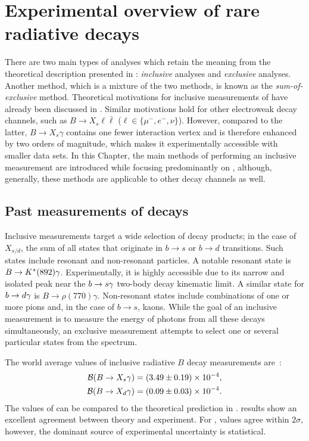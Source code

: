 \chapter{Experimental overview of rare radiative decays}\label{ch:exp_overview}

There are two main types of analyses which retain the meaning 
from the theoretical description presented in : \textit{inclusive} analyses and \textit{exclusive} analyses.
Another method, which is a mixture of the two methods, is known as the \textit{sum-of-exclusive} method.
Theoretical motivations for inclusive measurements of \BtoXsgamma have already been discussed in .
Similar motivations hold for other electroweak decay channels, such as $B\to X_s\ell\bar{\ell}$ ($\ell\in\{\mu^-,e^-,\nu\}$).
However, compared to the latter, $B\rightarrow X_s\gamma$ contains one fewer interaction vertex and is therefore enhanced by two orders of magnitude, which makes it experimentally accessible with smaller data sets.
In this Chapter, the main methods of performing an inclusive measurement are introduced while focusing predominantly on \BtoXsdgamma, although, generally, these methods are applicable to other decay channels as well.

\section{Past measurements of \safeBtoXsdgamma decays}

Inclusive measurements target a wide selection of decay products; in the case of $X_{s/d}$, the sum of all states that originate in $b\to s$ or $b\to d$ transitions.
Such states include resonant and non-resonant particles.
A notable resonant state is $B\rightarrow K^*(892)\gamma$.
Experimentally, it is highly accessible due to its narrow and isolated peak near the $b\rightarrow s\gamma$ two-body decay kinematic limit.
A similar state for $b\rightarrow d\gamma$ is $B\rightarrow \rho(770)\gamma$.
Non-resonant states include combinations of one or more pions and, in the case of $b\rightarrow s$, kaons.
While the goal of an inclusive measurement is to measure the energy of photons from all these decays simultaneously, an exclusive measurement attempts to select one or several particular states from the spectrum.

The world average values of inclusive radiative $B$ decay measurements are~\cite{Amhis:2022mac,Workman:2022ynf}:
\begin{align}\label{eq:btosgamma_experimental}
    \begin{split}
    \mathcal{B}(\BtoXsgamma)&=(3.49\pm 0.19)\times10^{-4},\\
    \mathcal{B}(\BtoXdgamma)&=(0.09\pm 0.03)\times10^{-4}.
    \end{split}
\end{align}
The values of  can be compared to the theoretical prediction in .
\BtoXsgamma results show an excellent agreement between theory and experiment.
For \BtoXdgamma, values agree within $2\sigma$, however, the dominant source of experimental uncertainty is statistical. 

